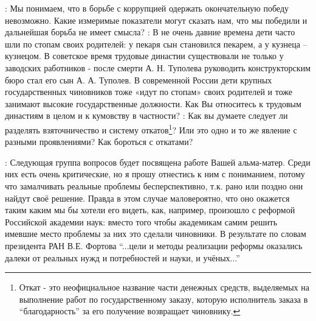 \begin{drama}
	\maxspeaks: Мы понимаем, что в борьбе с коррупцией одержать окончательную победу невозможно. Какие измеримые показатели могут сказать нам, что мы победили и дальнейшая борьба не имеет смысла? 
	\maxspeaks: В не очень давние времена дети часто шли по стопам своих родителей: у пекаря сын становился пекарем, а у кузнеца – кузнецом. В советское время трудовые династии существовали не только у заводских работников - после смерти А. Н. Туполева руководить конструкторским бюро стал его сын А. А. Туполев. В современной России дети крупных государственных чиновников тоже «идут по стопам» своих родителей и тоже занимают высокие государственные должности. Как Вы относитесь к трудовым династиям в целом и к кумовству в частности?
	\maxspeaks: Как вы думаете следует ли разделять взяточничество и систему откатов\footnote{Откат - это неофициальное название части денежных средств, выделяемых на выполнение работ по государственному заказу, которую исполнитель заказа в “благодарность” за его получение возвращает чиновнику.}? Или это одно и то же явление с разными проявлениями? Как бороться с откатами?

	\maxspeaks: Следующая группа вопросов будет посвящена работе Вашей альма-матер. Среди них есть очень критические, но я прошу отнестись к ним с пониманием, потому что замалчивать реальные проблемы бесперспективно, т.к. рано или поздно они найдут своё решение. Правда в этом случае маловероятно, что оно окажется таким каким мы бы хотели его видеть, как, например, произошло с реформой Российской академии наук: вместо того чтобы академикам самим решить имевшие место проблемы за них это сделали чиновники. В результате по словам президента РАН В.Е. Фортова “...цели и методы реализации реформы оказались далеки от реальных нужд и потребностей и науки, и учёных...”


\end{drama}
